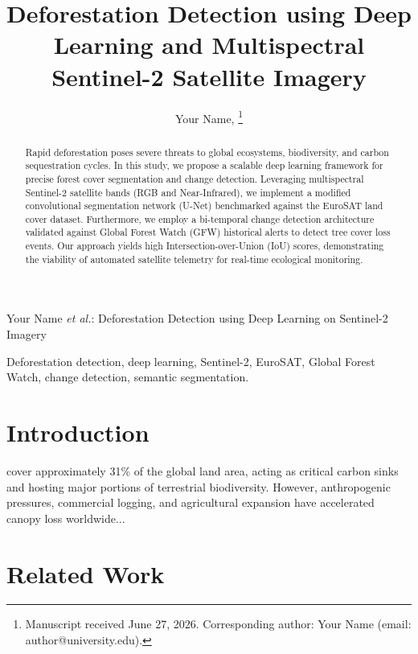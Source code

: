 \documentclass[journal,10pt]{IEEEtran}
\begin{document}
\title{Deforestation Detection using Deep Learning and Multispectral Sentinel-2 Satellite Imagery}

\author{Your Name, 
\thanks{Manuscript received June 27, 2026. Corresponding author: Your Name (email: author@university.edu).}}

%
{Your Name \MakeLowercase{\textit{et al.}}: Deforestation Detection using Deep Learning on Sentinel-2 Imagery}

\maketitle

\begin{abstract}
Rapid deforestation poses severe threats to global ecosystems, biodiversity, and carbon sequestration cycles. In this study, we propose a scalable deep learning framework for precise forest cover segmentation and change detection. Leveraging multispectral Sentinel-2 satellite bands (RGB and Near-Infrared), we implement a modified convolutional segmentation network (U-Net) benchmarked against the EuroSAT land cover dataset. Furthermore, we employ a bi-temporal change detection architecture validated against Global Forest Watch (GFW) historical alerts to detect tree cover loss events. Our approach yields high Intersection-over-Union (IoU) scores, demonstrating the viability of automated satellite telemetry for real-time ecological monitoring.
\end{abstract}

\begin{IEEEkeywords}
Deforestation detection, deep learning, Sentinel-2, EuroSAT, Global Forest Watch, change detection, semantic segmentation.
\end{IEEEkeywords}

\section{Introduction}
 cover approximately 31\% of the global land area, acting as critical carbon sinks and hosting major portions of terrestrial biodiversity. However, anthropogenic pressures, commercial logging, and agricultural expansion have accelerated canopy loss worldwide...

\section{Related Work}
\end{document}
